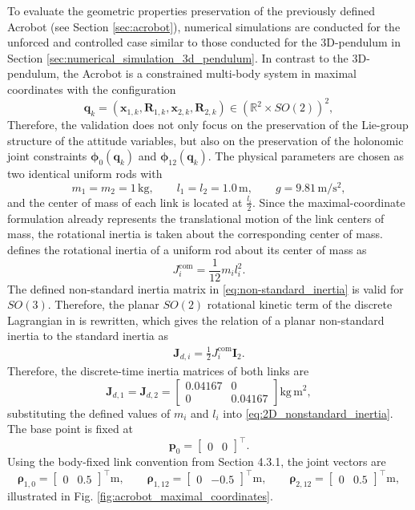 To evaluate the geometric properties preservation of the previously defined Acrobot (see Section \ref{sec:acrobot}), 
numerical simulations are conducted for the unforced and controlled case similar to those conducted for the 3D-pendulum 
in Section \ref{sec:numerical_simulation_3d_pendulum}.
In contrast to the 3D-pendulum, the Acrobot is a constrained multi-body system in maximal coordinates with the configuration 
\[
\bm{q}_k =
\left(
\bm{x}_{1,k},
\bm{R}_{1,k},
\bm{x}_{2,k},
\bm{R}_{2,k}
\right)
\in
\left(\mathbb{R}^{2}\times SO(2)\right)^2 ,
\]
Therefore, the validation does not only focus on the preservation of the Lie-group structure of the attitude variables, but also on the preservation of the holonomic joint constraints $\bm{\phi}_0(\bm{q}_k)$ and $\bm{\phi}_{12}(\bm{q}_k)$. 
The physical parameters are chosen as two identical uniform rods with
\[
    m_1=m_2=1\,\mathrm{kg},
    \qquad
    l_1=l_2=1.0\,\mathrm{m},
    \qquad
    g=9.81\,\mathrm{m/s^2},
\]
and the center of mass of each link is located at $\frac{l_i}{2}$.
Since the maximal-coordinate formulation already represents the translational
motion of the link centers of mass, the rotational inertia is taken about the
corresponding center of mass. \cite{Benacquista2018ClassicalMechanics} defines
the rotational inertia of a uniform rod about its center of mass as
\[
    J_i^{\mathrm{com}}
    =
    \frac{1}{12}m_i l_i^2.
\]
The defined non-standard inertia matrix in \ref{eq:non-standard_inertia}
is valid for $SO(3)$. Therefore, the planar
\(SO(2)\) rotational kinetic term of the discrete Lagrangian in
\cite{LeeLeokMcClamroch2007DiscreteControlSystems} is rewritten, which gives the relation of a planar non-standard
inertia to the standard inertia as
\begin{align}\label{eq:2D_nonstandard_inertia}
    \bm{J}_{d,i}
    =
    \frac{1}{2}J_i^{\mathrm{com}} \bm{I}_2.
\end{align}
Therefore, the discrete-time inertia matrices of both links are
\[
    \bm{J}_{d,1}
    =
    \bm{J}_{d,2}
    =
    \begin{bmatrix}
        0.04167 & 0\\
        0 & 0.04167
    \end{bmatrix}
    \mathrm{kg\,m^2},
\]
substituting the defined values of $m_i$ and $l_i$ into \eqref{eq:2D_nonstandard_inertia}.
The base point is fixed at
\[
    \bm{p}_0 =
    \begin{bmatrix}
        0 & 0
    \end{bmatrix}^{\top}.
\]
Using the body-fixed link convention from Section 4.3.1, the joint vectors are
\[
\bm{\rho}_{1,0}
=
\begin{bmatrix}
0 & 0.5
\end{bmatrix}^{\top}\mathrm{m},
\qquad
\bm{\rho}_{1,12}
=
\begin{bmatrix}
0 & -0.5
\end{bmatrix}^{\top}\mathrm{m},
\qquad
\bm{\rho}_{2,12}
=
\begin{bmatrix}
0 & 0.5
\end{bmatrix}^{\top}\mathrm{m},
\]
illustrated in Fig. \ref{fig:acrobot_maximal_coordinates}.

